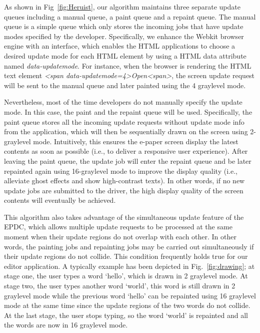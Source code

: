 \documentclass[]{sigchi}
\begin{document}
As shown in Fig~\ref{fig:Heruist}, our algorithm maintains three separate update queues including a manual queue, a paint queue and a repaint queue. The manual queue is a simple queue which only stores the incoming jobs that have update modes specified by the developer.
Specifically, we enhance the Webkit browser engine with an interface, which enables the HTML applications to choose a desired update mode for each HTML element by using a HTML data attribute named \textit{data-updatemode}. For instance, when the browser is rendering the HTML text element \textit{\textless span data-updatemode=4\textgreater Open\textless span\textgreater}, the screen update request will be sent to the manual queue and later painted using the 4 graylevel mode.




Nevertheless, most of the time developers do not manually specify the update mode. In this case, the paint and the repaint queue will be used. Specifically, 
the paint queue stores all the incoming update requests without update mode info from the application, which will then be sequentially drawn on the screen using 2-graylevel mode. Intuitively, this ensures the e-paper screen  display the latest contents as soon as possible (i.e., to deliver a responsive user experience).
After leaving the paint queue, the update job will enter the repaint queue and be later repainted again using 16-graylevel mode to improve the display quality (i.e., alleviate ghost effects and show high-contrast texts). In other words, if no new update jobs are submitted to the driver, the high display quality of the screen contents will eventually be achieved. 

This algorithm also takes advantage of the simultaneous update feature of the EPDC, which allows multiple update requests to be processed at the same moment when their update regions do not overlap with each other. In other words, the painting jobs and repainting jobs may be carried out simultaneously if their update regions do not collide. This condition frequently holds true for our editor application. A typically example has been depicted in Fig.~\ref{fig:drawing}; at stage one, the user types a word `hello', which is drawn in 2 graylevel mode. At stage two, the user types another word `world', this word is still drawn in 2 graylevel mode while the previous word `hello' can be repainted using 16 graylevel mode at the same time since the update regions of the two words do not collide. At the last stage, the user stops typing, so the word `world' is repainted and all the words are now in 16 graylevel mode.
\end{document}

